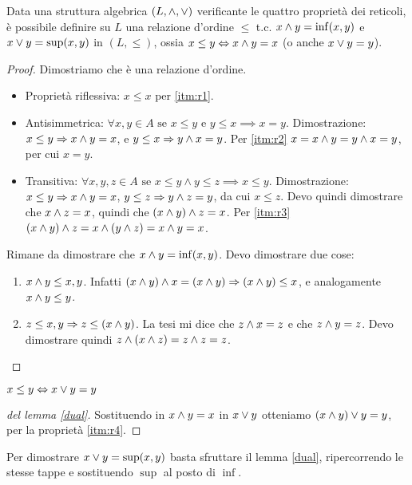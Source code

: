 \begin{theorem}
Data una struttura algebrica $(L, \wedge, \vee)$ verificante le quattro propriet\`a dei reticoli, \`e possibile definire su $L$ una relazione d'ordine $\le$ t.c. $ x \wedge y = \inf(x,y) $ e $ x \vee y = \sup(x,y) $ in $ (L, \le)$, ossia $x \le y \Leftrightarrow x \wedge y = x $ (o anche $ x \vee y = y$).
\end{theorem}
\begin{proof}
Dimostriamo che \`e una relazione d'ordine.
\begin{itemize}
    \item Propriet\`a riflessiva: $x \le x$ per \ref{itm:r1}.
    \item Antisimmetrica: $\forall x, y \in A \text{ se } x \leq y \text{ e }  y \leq x \implies x = y$. Dimostrazione: $x \le y \Rightarrow x \wedge y = x$, e $y \le x \Rightarrow y \wedge x = y$. Per \ref{itm:r2} $x = x \wedge y = y \wedge x = y$, per cui $x = y$.
    \item Transitiva: $\forall x, y, z \in A \text{ se } x \leq y \land y \leq z \implies x \leq y$. Dimostrazione: $x \le y \Rightarrow x \wedge y = x$, $y \le z \Rightarrow y \wedge z = y$, da cui $x \le z$. Devo quindi dimostrare che $x \wedge z = x$, quindi che $(x \wedge y) \wedge z = x$. Per \ref{itm:r3} $(x \wedge y) \wedge z = x \wedge (y \wedge z) = x \wedge y = x$. 
\end{itemize}
Rimane da dimostrare che $x \wedge y = \inf(x,y)$. Devo dimostrare due cose:
\begin{enumerate}
    \item $x \wedge y \le x, y$. Infatti $(x \wedge y) \wedge x = (x \wedge y) \Rightarrow (x \wedge y) \le x$, e analogamente $x \wedge y \le y$.
    \item $z \le x, y \Rightarrow z \le (x \wedge y)$. La tesi mi dice che $z \wedge x = z$ e che $z \wedge y = z$. Devo dimostrare quindi $z \wedge (x \wedge z) = z \wedge z = z$.
\end{enumerate}
\end{proof}

\begin{lem}\label{dual}
$ x \le y \Leftrightarrow x \vee y = y $
\end{lem}
\begin{proof}[del lemma \ref{dual}]
Sostituendo in $x \wedge y = x$ in $ x \vee y $ otteniamo $ (x \wedge y) \vee y = y $, per la propriet\`a \ref{itm:r4}.
\end{proof}
Per dimostrare $x \vee y = \sup(x,y)$ basta sfruttare il lemma \ref{dual}, ripercorrendo le stesse tappe e sostituendo $\sup$ al posto di $\inf$.

